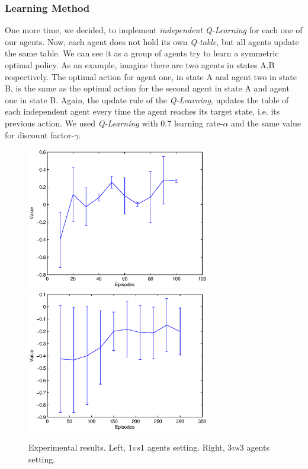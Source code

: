 \documentclass[conference]{IEEEtran}
\begin{document}
\subsubsection{Learning Method}
One more time, we decided, to implement \textit{independent Q-Learning} for each one of our agents. Now, each agent does not hold its own \textit{Q-table}, but all agents update the same table. We can see it as a group of agents try to learn a symmetric optimal policy. As an example, imagine there are two agents in states A,B respectively. The optimal action for agent one, in state A and agent two in state B, is the same as the optimal action for the second agent in state A and agent one in state B. Again, the update rule of the \textit{Q-Learning}, updates the table of each independent agent every time the agent reaches its target state, i.e. its previous action. We used \textit{Q-Learning} with $0.7$ learning rate-$\alpha$ and the same value for discount factor-$\gamma$.
\begin{figure}[t]
\centering  
    \includegraphics[width=8cm]{figures/snake1vs1.eps}\	
    \includegraphics[width=8cm]{figures/snake3vs3.eps}
   \caption{Experimental results. Left, $1vs1$ agents setting. Right, $3vs3$ agents setting.}
   \label{snake}
\end{figure}
\end{document}

